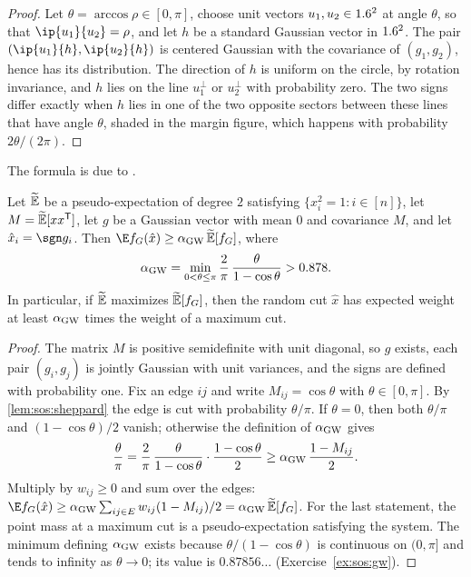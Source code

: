 \begin{refsection}
\begin{proof}
Let $\theta=\arccos\rho\in[0,\pi]$, choose unit vectors $u_1,u_2\in1.6^2$ at angle $\theta$, so that $\ip{u_1}{u_2}=\rho$, and let $h$ be a standard Gaussian vector in $1.6^2$. The pair $(\ip{u_1}{h},\ip{u_2}{h})$ is centered Gaussian with the covariance of $(g_1,g_2)$, hence has its distribution. The direction of $h$ is uniform on the circle, by rotation invariance, and $h$ lies on the line $u_1^\perp$ or $u_2^\perp$ with probability zero. The two signs differ exactly when $h$ lies in one of the two opposite sectors between these lines that have angle $\theta$, shaded in the margin figure, which happens with probability $2\theta/(2\pi)$.
\end{proof}

The formula is due to \textcite{Sheppard1899}.

\begin{theorem}\label{thm:sos:gw}
Let $\widetilde{\mathbb{E}}$ be a pseudo-expectation of degree $2$ satisfying $\{x_i^2=1:i\in[n]\}$, let $M=\widetilde{\mathbb{E}}[xx^{\mathsf T}]$, let $g$ be a Gaussian vector with mean $0$ and covariance $M$, and let $\hat x_i=\sgn g_i$. Then $\E f_G(\hat x)\ge\sosGW\,\sosPE[f_G]$, where
\[
  \alpha_{\mathrm{GW}}=\min_{0<\theta\le\pi}\frac{2}{\pi}\,\frac{\theta}{1-\cos\theta}>0.878.
\]
In particular, if $\widetilde{\mathbb{E}}$ maximizes $\widetilde{\mathbb{E}}[f_G]$, then the random cut $\hat x$ has expected weight at least $\alpha_{\mathrm{GW}}$ times the weight of a maximum cut.
\end{theorem}

\begin{proof}
The matrix $M$ is positive semidefinite with unit diagonal, so $g$ exists, each pair $(g_i,g_j)$ is jointly Gaussian with unit variances, and the signs are defined with probability one. Fix an edge $ij$ and write $M_{ij}=\cos\theta$ with $\theta\in[0,\pi]$. By \cref{lem:sos:sheppard} the edge is cut with probability $\theta/\pi$. If $\theta=0$, then both $\theta/\pi$ and $(1-\cos\theta)/2$ vanish; otherwise the definition of $\alpha_{\mathrm{GW}}$ gives
\[
  \frac{\theta}{\pi}=\frac2\pi\,\frac{\theta}{1-\cos\theta}\cdot\frac{1-\cos\theta}{2}\ge\alpha_{\mathrm{GW}}\,\frac{1-M_{ij}}{2}.
\]
Multiply by $w_{ij}\ge0$ and sum over the edges: $\E f_G(\hat x)\ge\sosGW\sum_{ij\in E}w_{ij}(1-M_{ij})/2=\sosGW\,\sosPE[f_G]$. For the last statement, the point mass at a maximum cut is a pseudo-expectation satisfying the system. The minimum defining $\alpha_{\mathrm{GW}}$ exists because $\theta/(1-\cos\theta)$ is continuous on $(0,\pi]$ and tends to infinity as $\theta\to0$; its value is $0.87856\ldots$ (Exercise~\ref{ex:sos:gw}).
\end{proof}


\end{refsection}
